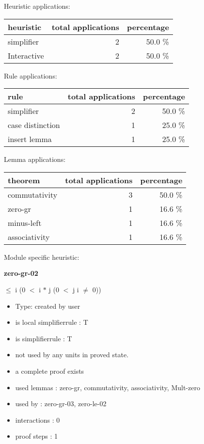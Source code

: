 \documentclass[a4paper]{article}
\begin{document}
\medskip


Heuristic applications:

\begin{supertabular}{l|r|r}
heuristic	& total applications & percentage \\ \hline
simplifier & 2 & 50.0 \% \\
Interactive & 2 & 50.0 \% \\

\end{supertabular}

Rule applications:

\begin{supertabular}{l|r|r}
rule	        & total applications & percentage \\ \hline
simplifier & 2 & 50.0 \% \\
case distinction & 1 & 25.0 \% \\
insert lemma & 1 & 25.0 \% \\

\end{supertabular}

Lemma applications:

\begin{supertabular}{l|r|r}
theorem	        & total applications & percentage \\ \hline
commutativity & 3 & 50.0 \% \\
zero-gr & 1 & 16.6 \% \\
minus-left & 1 & 16.6 \% \\
associativity & 1 & 16.6 \% \\

\end{supertabular}

Module specific heuristic:

\pagebreak

{\LARGE\bf zero-gr-02}\label{lemma-zero-gr-02}

\medskip

  $\le$ i \Imp (0 $<$ i $*$ j \Equiv \Not \Not (0 $<$ j \And i $\neq$ 0))

\begin{itemize}

\item Type: created by user

\item is local simplifierrule : T
\item is simplifierrule : T
\item not used by any units in proved state.
\item       a complete proof exists
\item       used lemmas  : zero-gr, commutativity, associativity, Mult-zero
\item       used by      : zero-gr-03, zero-le-02
\item       interactions : 0
\item       proof steps  : 1
\end{itemize}
\end{document}
